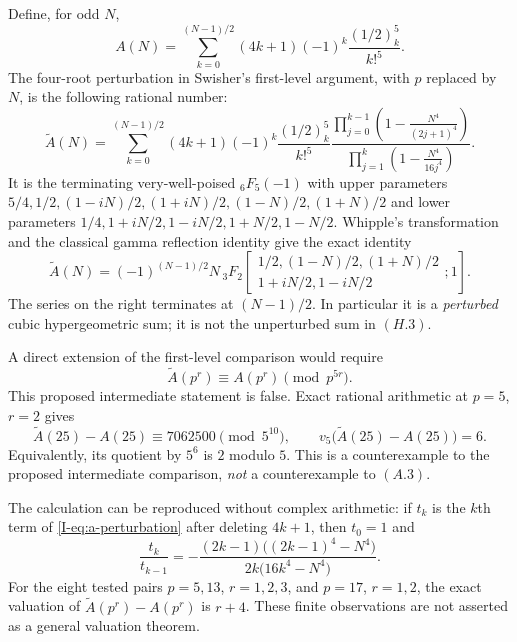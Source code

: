 \documentclass[11pt,letterpaper]{article}
\numberwithin{equation}{section}
\begin{document}
Define, for odd $N$,
\[
 A(N)=\sum_{k=0}^{(N-1)/2}(4k+1)(-1)^k\frac{(1/2)_k^5}{k!^5}.
\]
The four-root perturbation in Swisher's first-level argument, with $p$
replaced by $N$, is the following rational number:
\begin{equation}\label{I-eq:a-perturbation}
 \widetilde A(N)=\sum_{k=0}^{(N-1)/2}
 (4k+1)(-1)^k\frac{(1/2)_k^5}{k!^5}
 \frac{\displaystyle\prod_{j=0}^{k-1}
       \left(1-\frac{N^4}{(2j+1)^4}\right)}
      {\displaystyle\prod_{j=1}^{k}
       \left(1-\frac{N^4}{16j^4}\right)}.
\end{equation}
It is the terminating very-well-poised ${}_6F_5(-1)$ with upper
parameters $5/4,1/2,(1-iN)/2,(1+iN)/2,(1-N)/2,(1+N)/2$
and lower parameters $1/4,1+iN/2,1-iN/2,1+N/2,1-N/2$.
Whipple's transformation and the classical gamma reflection identity
give the exact identity
\begin{equation}\label{I-eq:a-whipple}
 \widetilde A(N)=(-1)^{(N-1)/2}N\,
 {}_3F_2\!\left[
 \begin{matrix}1/2,(1-N)/2,(1+N)/2\\
                 1+iN/2,1-iN/2\end{matrix};1\right].
\end{equation}
The series on the right terminates at $(N-1)/2$. In particular it is a
\emph{perturbed} cubic hypergeometric sum; it is not the unperturbed
sum in $(H.3)$.

A direct extension of the first-level comparison would require
\[
 \widetilde A(p^r)\equiv A(p^r)\pmod{p^{5r}}.
\]
This proposed intermediate statement is false. Exact rational
arithmetic at $p=5$, $r=2$ gives
\begin{equation}\label{I-eq:a-bridge-failure}
 \widetilde A(25)-A(25)\equiv7062500\pmod{5^{10}},
 \qquad
 v_5\bigl(\widetilde A(25)-A(25)\bigr)=6.
\end{equation}
Equivalently, its quotient by $5^6$ is $2$ modulo $5$.
This is a counterexample to the proposed intermediate comparison,
\emph{not} a counterexample to $(A.3)$.

The calculation can be reproduced without complex arithmetic: if
$t_k$ is the $k$th term of \eqref{I-eq:a-perturbation} after deleting
$4k+1$, then $t_0=1$ and
\[
 \frac{t_k}{t_{k-1}}=
 -\frac{(2k-1)\bigl((2k-1)^4-N^4\bigr)}
        {2k\bigl(16k^4-N^4\bigr)}.
\]
For the eight tested pairs $p=5,13$, $r=1,2,3$, and $p=17$, $r=1,2$,
the exact valuation of $\widetilde A(p^r)-A(p^r)$ is $r+4$.
These finite observations are not asserted as a general valuation theorem.
\end{document}
